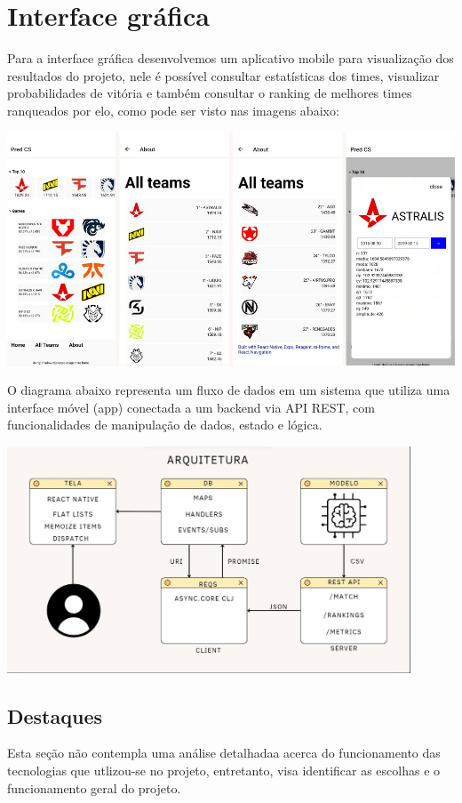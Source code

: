 \documentclass[a4paper,times,12pt]{article}
\begin{document}
\section {Interface gráfica}
\hspace{+15pt}
Para a interface gráfica desenvolvemos um aplicativo mobile para visualização dos resultados do projeto, nele é possível consultar estatísticas dos times, visualizar probabilidades de vitória e também consultar o ranking de melhores times ranqueados por elo, como pode ser visto nas imagens abaixo:

\begin{center}
  \includegraphics[width=16cm]{pred_cs_final.png}
\end{center}

O diagrama abaixo representa um fluxo de dados em um sistema que utiliza uma interface móvel (app) conectada a um backend via API REST, com funcionalidades de manipulação de dados, estado e lógica.

\begin{center}
  \includegraphics[width=12cm]{arquitetura.png}
\end{center}


\subsection{Destaques}
\hspace{+15pt}
Esta seção não contempla uma análise detalhadaa acerca do funcionamento das tecnologias que utlizou-se no projeto, entretanto, visa identificar as escolhas e o funcionamento geral do projeto. 
\end{document}
